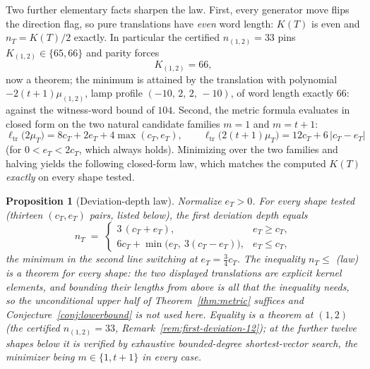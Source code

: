 \documentclass[11pt]{article}
\theoremstyle{plain}
\newtheorem{proposition}[theorem]{Proposition}
\theoremstyle{definition}
\theoremstyle{remark}
\begin{document}
Two further elementary facts sharpen the law. First, every generator move
flips the direction flag, so pure translations have \emph{even} word length:
$K(T)$ is even and $n_T = K(T)/2$ exactly. In particular the certified
$n_{(1,2)} = 33$ pins $K_{(1,2)} \in \{65,66\}$ and parity forces
\[
K_{(1,2)} = 66 ,
\]
now a theorem; the minimum is attained by the translation with polynomial
$-2(t+1)\mu_{(1,2)}$, lamp profile $(-10,\,2,\,2,\,-10)$, of word length
exactly $66$: against the witness-word bound of $104$. Second, the metric
formula evaluates in closed form on the two natural candidate families
$m = 1$ and $m = t+1$:
\[
\ell_{\mathrm{tr}}\bigl(2\mu_T\bigr) = 8c_T + 2e_T + 4\max(c_T, e_T),
\qquad
\ell_{\mathrm{tr}}\bigl(2(t{+}1)\mu_T\bigr) = 12 c_T + 6\,|c_T - e_T|
\]
(for $0 < e_T < 2c_T$, which always holds). Minimizing over the two families
and halving yields the following closed-form law, which matches the computed
$K(T)$ \emph{exactly} on every shape tested.

\begin{proposition}[Deviation-depth law]
\label{prop:deviation-law}
Normalize $e_T > 0$. For every shape tested (thirteen $(c_T,e_T)$ pairs,
listed below), the first deviation depth equals
\[
n_T \;=\;
\begin{cases}
3\,(c_T + e_T), & e_T \ge c_T,\\[2pt]
6c_T + \min\bigl(e_T,\ 3(c_T - e_T)\bigr), & e_T \le c_T,
\end{cases}
\]
the minimum in the second line switching at $e_T = \tfrac34 c_T$. The
inequality $n_T \le$ (law) is a theorem for every shape: the two displayed
translations are explicit kernel elements, and bounding their lengths from above
is all that the inequality needs, so the unconditional upper half of
Theorem~\ref{thm:metric} suffices and Conjecture~\ref{conj:lowerbound} is not
used here. Equality is a theorem at $(1,2)$ (the certified
$n_{(1,2)} = 33$, Remark~\ref{rem:first-deviation-12}); at the further twelve
shapes below it is verified by exhaustive bounded-degree shortest-vector search,
the minimizer being $m \in \{1, t+1\}$ in every case.
\end{proposition}
\end{document}

